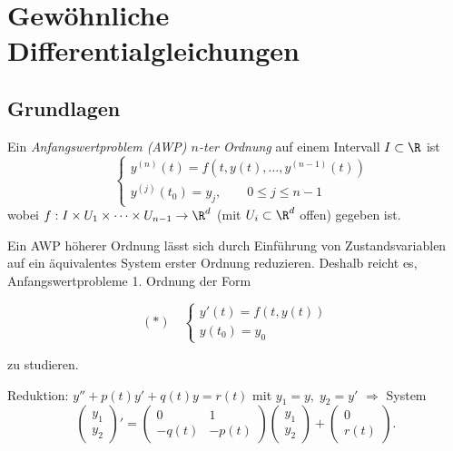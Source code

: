 \documentclass[11pt, a4paper]{article}
\begin{document}

\tableofcontents





\newpage
\section{Gewöhnliche Differentialgleichungen}

\vspace{0.3cm} \par \subsection{Grundlagen}


 \begin{definition} 

Ein \emph{Anfangswertproblem (AWP) $n$-ter Ordnung} auf einem Intervall $I\subset \R$ ist
\[
\quad \begin{cases}y^{(n)}(t)=f(t,y(t),\dots, y^{(n-1)}(t))\\ y^{(j)}(t_0)=y_j, \qquad 0\leq j\leq n-1\end{cases}
\]
wobei $f: I\times U_1 \times \dots \times U_{n-1}\to\R^d$ (mit $U_i\subset\R^d$ offen) gegeben ist. 
\end{definition}

\begin{note} \label{AWP} Ein AWP höherer Ordnung lässt sich durch Einführung von Zustandsvariablen auf ein äquivalentes System erster Ordnung reduzieren. Deshalb reicht es, Anfangswertprobleme 1. Ordnung der Form 

$$ (*)\quad \begin{cases}y'(t)=f(t,y(t))\\ y(t_0)=y_0 \end{cases} $$

zu studieren.
\end{note}
 \begin{example}
Reduktion: $y''+p(t)y'+q(t)y=r(t)$ mit $y_1=y,\; y_2=y'$ $\Rightarrow$ System
\[
\begin{pmatrix}y_1\\y_2\end{pmatrix}'=
\begin{pmatrix}0&1\\-q(t)&-p(t)\end{pmatrix}
\begin{pmatrix}y_1\\y_2\end{pmatrix}+
\begin{pmatrix}0\\r(t)\end{pmatrix}.
\]
\end{example}
\end{document}
